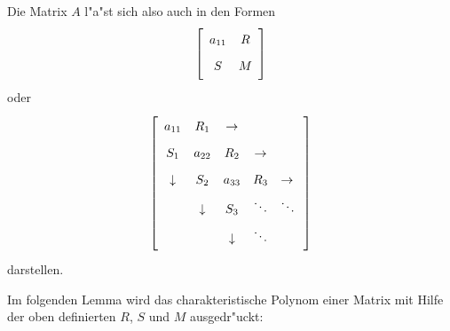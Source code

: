 Die Matrix $A$ l"a"st sich also auch in den Formen
\[
   \left[
   \begin{array}{cc}
       a_{11} & R \MatStrut \\
       S      & M \MatStrut
   \end{array}
   \right]
\]
oder
\[
   \left[
   \begin{array}{ccccc}
       a_{11}     & R_1        & \rightarrow &             & \MatStrut \\
       S_1        & a_{22}     & R_2         & \rightarrow & \MatStrut \\
       \downarrow & S_2        & a_{33}      & R_3         & \rightarrow
                                                             \MatStrut \\
                  & \downarrow & S_3         & \ddots      & \ddots
                                                             \MatStrut \\
                  &            & \downarrow  & \ddots      & \MatStrut
   \end{array}
   \right]
\]
darstellen.

Im folgenden Lemma wird das charakteristische Polynom einer Matrix
mit Hilfe der oben definierten $R$, $S$ und $M$ ausgedr"uckt:

